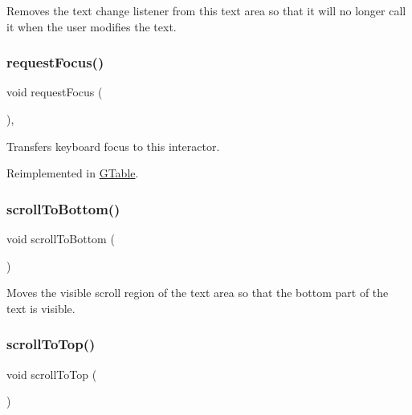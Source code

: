 Removes the text change listener from this text area so that it will no longer call it when the user modifies the text. 

\mbox{\label{classGInteractor_a519fb2ac767f8b2febbb50b898b8c8cb}} 
\subsubsection{\texorpdfstring{request\+Focus()}{requestFocus()}}
{\footnotesize\ttfamily void request\+Focus (\begin{DoxyParamCaption}{ }\end{DoxyParamCaption})\hspace{0.3cm}{\ttfamily [virtual]}, {\ttfamily [inherited]}}



Transfers keyboard focus to this interactor. 



Reimplemented in \mbox{\hyperlink{classGTable_a49b39e0eeaf5af829e8956e9055c5cdc}{G\+Table}}.

\mbox{\label{classGTextArea_ad4c9b6140b529865a6cdeed37a339237}} 
\subsubsection{\texorpdfstring{scroll\+To\+Bottom()}{scrollToBottom()}}
{\footnotesize\ttfamily void scroll\+To\+Bottom (\begin{DoxyParamCaption}{ }\end{DoxyParamCaption})\hspace{0.3cm}{\ttfamily [virtual]}}



Moves the visible scroll region of the text area so that the bottom part of the text is visible. 

\mbox{\label{classGTextArea_a9eacfcf7c186936ed957dd1c8a9c6b64}} 
\subsubsection{\texorpdfstring{scroll\+To\+Top()}{scrollToTop()}}
{\footnotesize\ttfamily void scroll\+To\+Top (\begin{DoxyParamCaption}{ }\end{DoxyParamCaption})\hspace{0.3cm}{\ttfamily [virtual]}}



